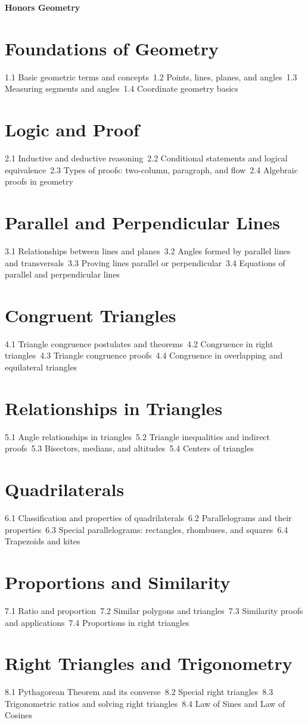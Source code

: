 {\LARGE \bf{Honors Geometry}}
\section{Foundations of Geometry}
1.1 Basic geometric terms and concepts\
1.2 Points, lines, planes, and angles\
1.3 Measuring segments and angles\
1.4 Coordinate geometry basics\
\section{Logic and Proof}
2.1 Inductive and deductive reasoning\
2.2 Conditional statements and logical equivalence\
2.3 Types of proofs: two-column, paragraph, and flow\
2.4 Algebraic proofs in geometry\
\section{Parallel and Perpendicular Lines}
3.1 Relationships between lines and planes\
3.2 Angles formed by parallel lines and transversals\
3.3 Proving lines parallel or perpendicular\
3.4 Equations of parallel and perpendicular lines\
\section{Congruent Triangles}
4.1 Triangle congruence postulates and theorems\
4.2 Congruence in right triangles\
4.3 Triangle congruence proofs\
4.4 Congruence in overlapping and equilateral triangles\
\section{Relationships in Triangles}
5.1 Angle relationships in triangles\
5.2 Triangle inequalities and indirect proofs\
5.3 Bisectors, medians, and altitudes\
5.4 Centers of triangles\
\section{Quadrilaterals}
6.1 Classification and properties of quadrilaterals\
6.2 Parallelograms and their properties\
6.3 Special parallelograms: rectangles, rhombuses, and squares\
6.4 Trapezoids and kites\
\section{Proportions and Similarity}
7.1 Ratio and proportion\
7.2 Similar polygons and triangles\
7.3 Similarity proofs and applications\
7.4 Proportions in right triangles\
\section{Right Triangles and Trigonometry}
8.1 Pythagorean Theorem and its converse\
8.2 Special right triangles\
8.3 Trigonometric ratios and solving right triangles\
8.4 Law of Sines and Law of Cosines\
